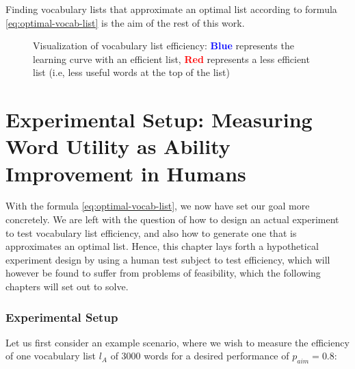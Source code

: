Finding vocabulary lists that approximate an optimal list according to formula \ref{eq:optimal-vocab-list} is the aim of the rest of this work.

\begin{figure}[H]
	\centering
	\caption{Visualization of vocabulary list efficiency: \textbf{\textcolor{blue}{Blue}} represents the learning curve with an efficient list, \textbf{\textcolor{red}{Red}} represents a less efficient list (i.e, less useful words at the top of the list)}
	\label{fig:voc-list-efficiency}
\end{figure}

\section{Experimental Setup: Measuring Word Utility as Ability Improvement in Humans} \label{sec:human-efficiency-testing}


With the formula \ref{eq:optimal-vocab-list}, we now have set our goal more concretely.
We are left with the question of how to design an actual experiment to test vocabulary list efficiency, and also how to generate one that is approximates an optimal list.
Hence, this chapter lays forth a hypothetical experiment design by using a human test subject to test efficiency, which will however be found to suffer from problems of feasibility, which the following chapters will set out to solve.

\subsubsection{Experimental Setup}
Let us first consider an example scenario, where we wish to measure the efficiency of one vocabulary list $l_A$ of 3000 words for a desired performance of $p_{aim} = 0.8$:

